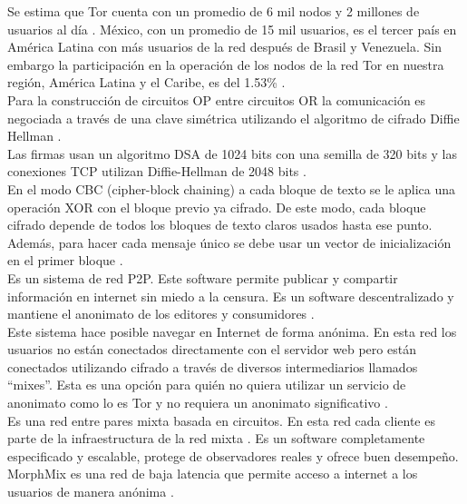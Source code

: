 \documentclass[10pt,letterpaper]{article}
\begin{document}
Se estima que Tor cuenta con un promedio de 6 mil nodos y 2 millones de usuarios al día \cite{Tororg}. México, con un promedio de 15 mil usuarios, es el tercer país en América Latina con más usuarios de la red después de Brasil y Venezuela. Sin embargo la participación en la operación de los nodos de la red Tor en nuestra región, América Latina y el Caribe, es del 1.53\% \cite{Tormex}.\\

 Para la construcción de circuitos OP entre circuitos OR la comunicación es negociada a través de una clave simétrica utilizando el algoritmo de cifrado Diffie Hellman \cite{syverson2004tor}.\\
 
 Las firmas usan un algoritmo DSA de 1024 bits con una semilla de 320 bits y las conexiones TCP utilizan Diffie-Hellman de 2048 bits \cite{jrandom2010i2p}.\\
 
En el modo CBC (cipher-block chaining) a cada bloque de texto se le aplica una operación XOR con el bloque previo ya cifrado. De este modo, cada bloque cifrado depende de todos los bloques de texto claros usados hasta ese punto. Además, para hacer cada mensaje único se debe usar un vector de inicialización en el primer bloque \cite{dworkin2001recommendation}.\\

Es un sistema de red P2P. Este software permite publicar y compartir información en internet sin miedo a la censura. Es un software descentralizado y mantiene el anonimato de los editores y consumidores \cite{Freenetproject}.\\

Este sistema hace posible navegar en Internet de forma anónima. En esta red los usuarios no están conectados directamente con el servidor web pero están conectados utilizando cifrado a través de diversos intermediarios llamados ``mixes''. Esta es una opción para quién no quiera utilizar un servicio de anonimato como lo es Tor y no requiera un anonimato significativo \cite{JonDonym}.\\

Es una red entre pares mixta basada en circuitos. En esta red cada cliente es parte de la infraestructura de la red mixta . Es un software completamente especificado y escalable, protege de observadores reales y ofrece buen desempeño. MorphMix es una red de baja latencia que permite acceso a internet a los usuarios de manera anónima \cite{rennhard2002introducing}.\\
\end{document}
